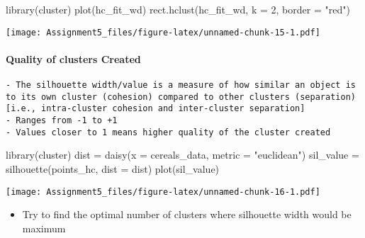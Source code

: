 \documentclass[
]{article}
\newenvironment{Shaded}{\begin{snugshade}}{\end{snugshade}}
\newcommand{\AttributeTok}[1]{\textcolor[rgb]{0.77,0.63,0.00}{#1}}
\newcommand{\DecValTok}[1]{\textcolor[rgb]{0.00,0.00,0.81}{#1}}
\newcommand{\FunctionTok}[1]{\textcolor[rgb]{0.00,0.00,0.00}{#1}}
\newcommand{\NormalTok}[1]{#1}
\newcommand{\OtherTok}[1]{\textcolor[rgb]{0.56,0.35,0.01}{#1}}
\newcommand{\StringTok}[1]{\textcolor[rgb]{0.31,0.60,0.02}{#1}}
\providecommand{\tightlist}{%
  \setlength{\itemsep}{0pt}\setlength{\parskip}{0pt}}
\begin{document}
\begin{Shaded}
\begin{Highlighting}[]
\FunctionTok{library}\NormalTok{(cluster)}
\FunctionTok{plot}\NormalTok{(hc\_fit\_wd)}
\FunctionTok{rect.hclust}\NormalTok{(hc\_fit\_wd, }\AttributeTok{k =} \DecValTok{2}\NormalTok{, }\AttributeTok{border =} \StringTok{"red"}\NormalTok{)}
\end{Highlighting}
\end{Shaded}

\texttt{[image: Assignment5\_files/figure-latex/unnamed-chunk-15-1.pdf]}

\hypertarget{quality-of-clusters-created}{%
\paragraph{Quality of clusters
Created}\label{quality-of-clusters-created}}

\begin{verbatim}
- The silhouette width/value is a measure of how similar an object is to its own cluster (cohesion) compared to other clusters (separation)  [i.e., intra-cluster cohesion and inter-cluster separation]
- Ranges from -1 to +1  
- Values closer to 1 means higher quality of the cluster created 
\end{verbatim}

\begin{Shaded}
\begin{Highlighting}[]
\FunctionTok{library}\NormalTok{(cluster)}
\NormalTok{dist }\OtherTok{=} \FunctionTok{daisy}\NormalTok{(}\AttributeTok{x =}\NormalTok{ cereals\_data, }\AttributeTok{metric =} \StringTok{"euclidean"}\NormalTok{)}
\NormalTok{sil\_value }\OtherTok{=} \FunctionTok{silhouette}\NormalTok{(points\_hc, }\AttributeTok{dist =}\NormalTok{ dist)}
\FunctionTok{plot}\NormalTok{(sil\_value)}
\end{Highlighting}
\end{Shaded}

\texttt{[image: Assignment5\_files/figure-latex/unnamed-chunk-16-1.pdf]}

\begin{itemize}
\tightlist
\item
  Try to find the optimal number of clusters where silhouette width
  would be maximum
\end{itemize}
\end{document}
